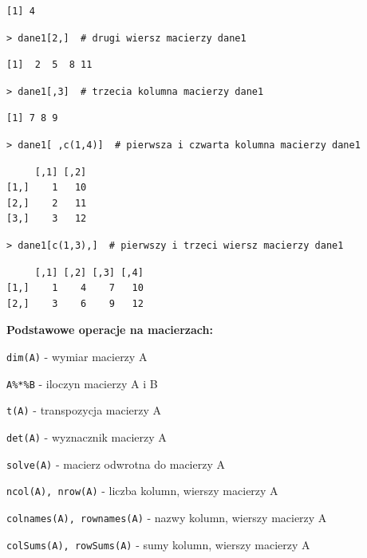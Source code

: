 \documentclass[12pt,B5paper,]{book}
\begin{document}
\begin{verbatim}
[1] 4
\end{verbatim}

\begin{verbatim}
> dane1[2,]  # drugi wiersz macierzy dane1
\end{verbatim}

\begin{verbatim}
[1]  2  5  8 11
\end{verbatim}

\begin{verbatim}
> dane1[,3]  # trzecia kolumna macierzy dane1
\end{verbatim}

\begin{verbatim}
[1] 7 8 9
\end{verbatim}

\begin{verbatim}
> dane1[ ,c(1,4)]  # pierwsza i czwarta kolumna macierzy dane1
\end{verbatim}

\begin{verbatim}
     [,1] [,2]
[1,]    1   10
[2,]    2   11
[3,]    3   12
\end{verbatim}

\begin{verbatim}
> dane1[c(1,3),]  # pierwszy i trzeci wiersz macierzy dane1
\end{verbatim}

\begin{verbatim}
     [,1] [,2] [,3] [,4]
[1,]    1    4    7   10
[2,]    3    6    9   12
\end{verbatim}

\vspace{0.8cm}

\textbf{Podstawowe operacje na macierzach: }

\texttt{dim(A)} - wymiar macierzy A

\texttt{A\%*\%B} - iloczyn macierzy A i B

\texttt{t(A)} - transpozycja macierzy A

\texttt{det(A)} - wyznacznik macierzy A

\texttt{solve(A)} - macierz odwrotna do macierzy A

\texttt{ncol(A), nrow(A)} - liczba kolumn, wierszy macierzy A

\texttt{colnames(A), rownames(A)} - nazwy kolumn, wierszy macierzy A

\texttt{colSums(A), rowSums(A)} - sumy kolumn, wierszy macierzy A
\end{document}
